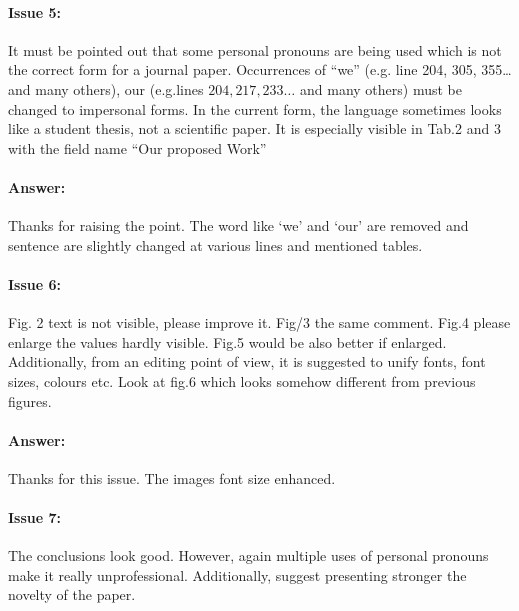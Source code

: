 \documentclass{article}
\begin{document}
\paragraph{Issue 5:}
\begin{displayquote}
It must be pointed out that some personal pronouns are being used which is not the correct form for a journal paper. Occurrences of “we” (e.g. line 204, 305, 355…and many others), our (e.g.lines $204,217,233 \ldots$ and many others) must be changed to impersonal forms.  In the current form, the language sometimes looks like a student thesis, not a scientific paper. It is especially visible in Tab.2 and 3 with the field name “Our proposed Work”
\end{displayquote}

\paragraph{Answer:}
Thanks for raising the point. The word like `we' and `our' are removed and sentence are slightly changed at various lines and mentioned tables.

\paragraph{Issue 6:}
\begin{displayquote}
Fig. 2 text is not visible, please improve it.  Fig/3 the same comment. Fig.4 please enlarge the values hardly visible. Fig.5 would be also better if enlarged. Additionally, from an editing point of view, it is suggested to unify fonts, font sizes, colours etc. Look at fig.6 which looks somehow different from previous figures.
\end{displayquote}

\paragraph{Answer:}
Thanks for this issue. The images font size enhanced.

\paragraph{Issue 7:}
\begin{displayquote}
The conclusions look good. However, again multiple uses of personal pronouns make it really unprofessional. Additionally, suggest presenting stronger the novelty of the paper.

\end{displayquote}
\end{document}
